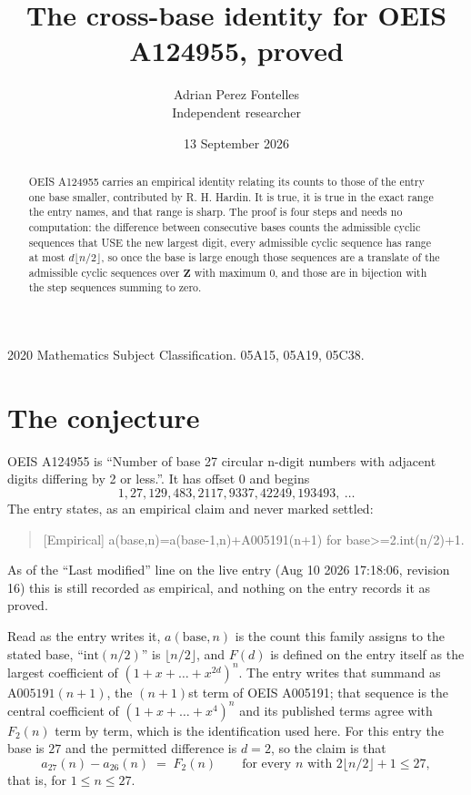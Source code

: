 \documentclass[11pt,a4paper]{article}
\title{The cross-base identity for OEIS A124955, proved}
\author{Adrian Perez Fontelles\\ \small Independent researcher}
\date{13 September 2026}
\theoremstyle{plain}
\theoremstyle{definition}
\begin{document}
\maketitle

\begin{abstract}
OEIS A124955 carries an empirical identity relating its counts to those of the entry one base
smaller, contributed by R. H. Hardin. It is true, it is true in the exact range the entry
names, and that range is sharp. The proof is four steps and needs no computation: the
difference between consecutive bases counts the admissible cyclic sequences that USE the new
largest digit, every admissible cyclic sequence has range at most $d\lfloor n/2\rfloor$, so
once the base is large enough those sequences are a translate of the admissible cyclic
sequences over $\mathbf{Z}$ with maximum $0$, and those are in bijection with the step
sequences summing to zero.
\end{abstract}

\noindent\small 2020 Mathematics Subject Classification. 05A15, 05A19, 05C38.\normalsize

\section{The conjecture}

OEIS A124955 is ``Number of base 27 circular n-digit numbers with adjacent digits differing by 2 or less.''. It has offset $0$ and begins
\[
1, 27, 129, 483, 2117, 9337, 42249, 193493,\ \dots
\]
The entry states, as an empirical claim and never marked settled:
\begin{quote}
[Empirical] a(base,n)=a(base-1,n)+A005191(n+1) for base>=2.int(n/2)+1.
\end{quote}
As of the ``Last modified'' line on the live entry (Aug 10 2026 17:18:06, revision 16)
this is still recorded as empirical, and nothing on the entry records it as proved.

Read as the entry writes it, $a(\mathrm{base},n)$ is the count this family assigns to the
stated base, ``$\mathrm{int}(n/2)$'' is $\lfloor n/2\rfloor$, and $F(d)$ is defined on the
entry itself as the largest coefficient of $(1+x+\dots+x^{2d})^{n}$. The entry writes that summand as $\mathrm{A005191}(n+1)$, the $(n+1)$st term of OEIS A005191; that sequence is the central coefficient of $(1+x+\dots+x^{4})^{n}$ and its published terms agree with $F_{2}(n)$ term by term, which is the identification used here. For this entry
the base is $27$ and the permitted difference is $d=2$, so the claim is that
\[
a_{27}(n)-a_{26}(n)\;=\;F_{2}(n)
\qquad\text{for every } n \text{ with } 2\lfloor n/2\rfloor+1\le27,
\]
that is, for $1\le n\le27$.
\end{document}
